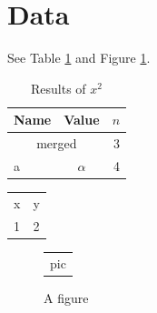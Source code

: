 \documentclass{article}
\begin{document}
\section{Data}\label{sec}
See Table \ref{tab:one} and Figure \ref{fig:a}.

\begin{table}[htbp]
\centering
\caption{Results of $x^2$}\label{tab:one}
\begin{tabular}{|l|c|r|}
\hline
Name & Value & $n$ \\
\hline
\multicolumn{2}{|c|}{merged} & 3 \\
a & $\alpha$ & 4 \\
\hline
\end{tabular}
\end{table}

\begin{center}
\begin{tabular}{ll}
x & y \\
1 & 2
\end{tabular}
\end{center}

\begin{figure}[h]
\begin{center}
\begin{tabular}{c}
pic
\end{tabular}
\end{center}
\caption{A figure}\label{fig:a}
\end{figure}
\end{document}
